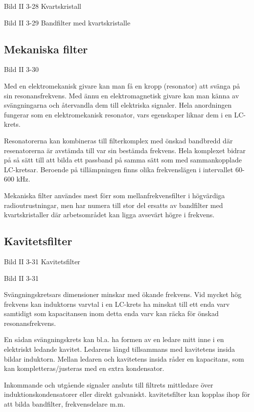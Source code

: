 Bild II 3-28 Kvartskristall

Bild II 3-29 Bandfilter med kvartskristalle

\subsection{Mekaniska filter}

Bild II 3-30

Med en elektromekanisk givare kan man få en kropp (resonator) att svänga på sin
resonansfrekvens. Med ännu en elektromagnetisk givare kan man känna av
svängningarna och återvandla dem till elektriska signaler. Hela anordningen
fungerar som en elektromekanisk resonator, vars egenskaper liknar dem i en
LC-krets.

Resonatorerna kan kombineras till filterkomplex med önskad bandbredd där
resenatorerna är avstämda till var sin bestämda frekvens. Hela komplexet bidrar
på så sätt till att bilda ett passband på samma sätt som med sammankopplade
LC-kretsar. Beroende på tillämpningen finns olika frekvenslägen i intervallet
60-600 kHz.

Mekaniska filter användes mest förr som
mellanfrekvensfilter i högvärdiga radioutrustningar, men har numera till stor del ersatts
av bandfilter med kvartskristaller där arbetsområdet kan ligga avsevärt högre i frekvens.

\subsection{Kavitetsfilter}

Bild II 3-31 Kavitetsfilter

Bild II 3-31

Svängningskretsars dimensioner minskar med ökande frekvens. Vid mycket hög
frekvens kan induktorns varvtal i en LC-krets ha minskat till ett enda varv
samtidigt som kapacitansen inom detta enda varv kan räcka för önskad
resonansfrekvens.

En sådan svängningskrets kan bl.a. ha formen av en ledare mitt inne i en
elektriskt ledande kavitet. Ledarens längd tillsammans med kavitetens insida
bildar induktorn. Mellan ledaren och kavitetens insida råder en kapacitans,
som kan kompletteras/justeras med en extra kondensator.

Inkommande och utgående signaler ansluts till filtrets mittledare över
induktionskondensatorer eller direkt galvaniskt. kavitetsfilter kan kopplas
ihop för att bilda bandfilter, frekvensdelare m.m.

